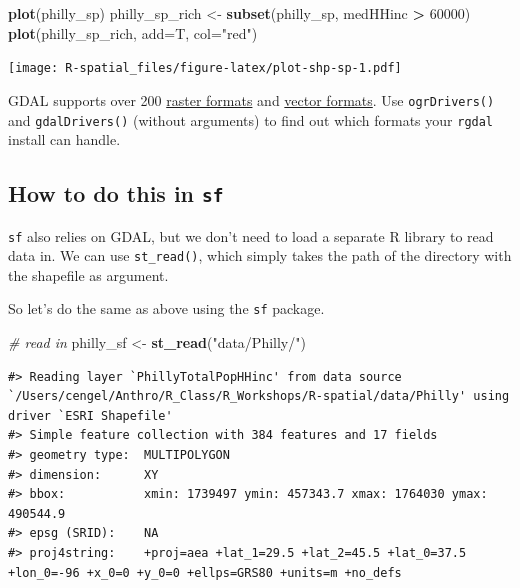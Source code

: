 \documentclass[]{book}
\newenvironment{Shaded}{\begin{snugshade}}{\end{snugshade}}
\newcommand{\KeywordTok}[1]{\textcolor[rgb]{0.13,0.29,0.53}{\textbf{#1}}}
\newcommand{\DataTypeTok}[1]{\textcolor[rgb]{0.13,0.29,0.53}{#1}}
\newcommand{\DecValTok}[1]{\textcolor[rgb]{0.00,0.00,0.81}{#1}}
\newcommand{\StringTok}[1]{\textcolor[rgb]{0.31,0.60,0.02}{#1}}
\newcommand{\CommentTok}[1]{\textcolor[rgb]{0.56,0.35,0.01}{\textit{#1}}}
\newcommand{\OperatorTok}[1]{\textcolor[rgb]{0.81,0.36,0.00}{\textbf{#1}}}
\newcommand{\NormalTok}[1]{#1}
\theoremstyle{definition}
\theoremstyle{definition}
\theoremstyle{definition}
\theoremstyle{remark}
\begin{document}
\begin{Shaded}
\begin{Highlighting}[]
\KeywordTok{plot}\NormalTok{(philly_sp)}
\NormalTok{philly_sp_rich <-}\StringTok{ }\KeywordTok{subset}\NormalTok{(philly_sp, medHHinc }\OperatorTok{>}\StringTok{ }\DecValTok{60000}\NormalTok{)}
\KeywordTok{plot}\NormalTok{(philly_sp_rich, }\DataTypeTok{add=}\NormalTok{T, }\DataTypeTok{col=}\StringTok{"red"}\NormalTok{)}
\end{Highlighting}
\end{Shaded}

\texttt{[image: R-spatial\_files/figure-latex/plot-shp-sp-1.pdf]}

GDAL supports over 200
\href{http://www.gdal.org/formats_list.html}{raster formats} and
\href{http://www.gdal.org/ogr_formats.html}{vector formats}. Use
\texttt{ogrDrivers()} and \texttt{gdalDrivers()} (without arguments) to
find out which formats your \texttt{rgdal} install can handle.

\subsection{\texorpdfstring{How to do this in
\texttt{sf}}{How to do this in sf}}\label{how-to-do-this-in-sf}

\texttt{sf} also relies on GDAL, but we don't need to load a separate R
library to read data in. We can use \texttt{st\_read()}, which simply
takes the path of the directory with the shapefile as argument.

So let's do the same as above using the \texttt{sf} package.

\begin{Shaded}
\begin{Highlighting}[]
\CommentTok{# read in}
\NormalTok{philly_sf <-}\StringTok{ }\KeywordTok{st_read}\NormalTok{(}\StringTok{"data/Philly/"}\NormalTok{)}
\end{Highlighting}
\end{Shaded}

\begin{verbatim}
#> Reading layer `PhillyTotalPopHHinc' from data source `/Users/cengel/Anthro/R_Class/R_Workshops/R-spatial/data/Philly' using driver `ESRI Shapefile'
#> Simple feature collection with 384 features and 17 fields
#> geometry type:  MULTIPOLYGON
#> dimension:      XY
#> bbox:           xmin: 1739497 ymin: 457343.7 xmax: 1764030 ymax: 490544.9
#> epsg (SRID):    NA
#> proj4string:    +proj=aea +lat_1=29.5 +lat_2=45.5 +lat_0=37.5 +lon_0=-96 +x_0=0 +y_0=0 +ellps=GRS80 +units=m +no_defs
\end{verbatim}
\end{document}
